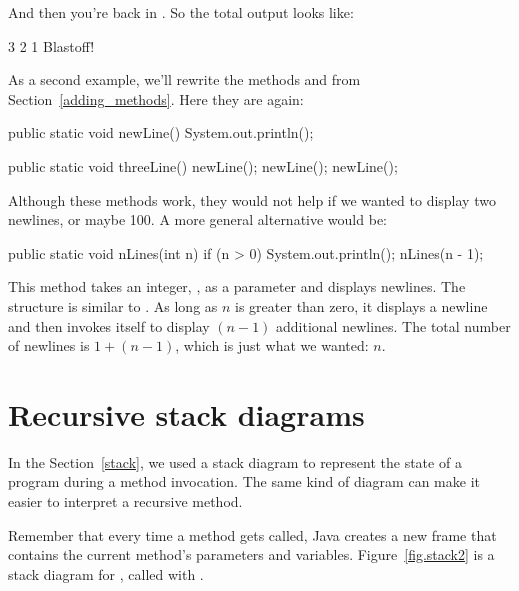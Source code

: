 And then you're back in .
So the total output looks like:

\begin{stdout}
3
2
1
Blastoff!
\end{stdout}

As a second example, we'll rewrite the methods  and  from Section~\ref{adding_methods}.
Here they are again:

\begin{code}
public static void newLine() {
    System.out.println();
}

public static void threeLine() {
    newLine();
    newLine();
    newLine();
}
\end{code}


Although these methods work, they would not help if we wanted to display two newlines, or maybe 100.
A more general alternative would be:

\begin{code}
public static void nLines(int n) {
    if (n > 0) {
        System.out.println();
        nLines(n - 1);
    }
}
\end{code}

This method takes an integer, , as a parameter and displays  newlines.
The structure is similar to .
As long as $n$ is greater than zero, it displays a newline and then invokes itself to display $(n-1)$ additional newlines.
The total number of newlines is $1 + (n - 1)$, which is just what we wanted: $n$.


\section{Recursive stack diagrams}


In the Section~\ref{stack}, we used a stack diagram to represent the state of a program during a method invocation.
The same kind of diagram can make it easier to interpret a recursive method.

Remember that every time a method gets called, Java creates a new frame that contains the current method's parameters and variables.
Figure~\ref{fig.stack2} is a stack diagram for , called with .

